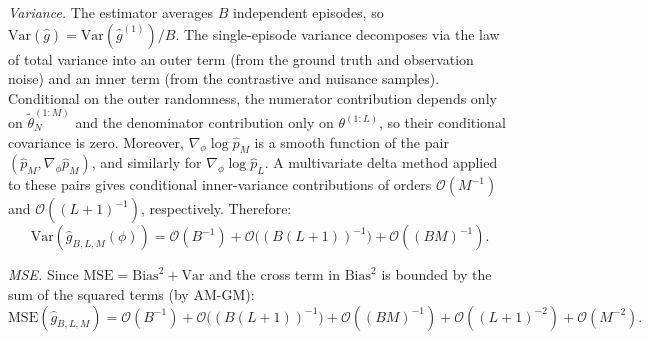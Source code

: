 \emph{Variance.} The estimator averages $B$ independent episodes, so $\mathrm{Var}(\hat g) = \mathrm{Var}(\hat g^{(1)})/B$. The single-episode variance decomposes via the law of total variance into an outer term (from the ground truth and observation noise) and an inner term (from the contrastive and nuisance samples). Conditional on the outer randomness, the numerator contribution depends only on $\tilde{\theta}_N^{(1:M)}$ and the denominator contribution only on $\theta^{(1:L)}$, so their conditional covariance is zero. Moreover, $\nabla_\phi \log \widehat p_M$ is a smooth function of the pair $(\widehat p_M, \nabla_\phi \widehat p_M)$, and similarly for $\nabla_\phi \log \widehat p_L$. A multivariate delta method applied to these pairs gives conditional inner-variance contributions of orders $\mathcal{O}(M^{-1})$ and $\mathcal{O}((L+1)^{-1})$, respectively. Therefore:
\begin{equation}
\mathrm{Var}(\hat g_{B,L,M}(\phi)) = \mathcal{O}(B^{-1}) + \mathcal{O}\big((B(L+1))^{-1}\big) + \mathcal{O}((BM)^{-1}).
\end{equation}

\emph{MSE.} Since $\mathrm{MSE} = \mathrm{Bias}^2 + \mathrm{Var}$ and the cross term in $\mathrm{Bias}^2$ is bounded by the sum of the squared terms (by AM-GM):
\begin{equation}
\label{eq:grad_mse_scaling}
\mathrm{MSE}(\hat g_{B,L,M})
= \mathcal{O}(B^{-1})
+ \mathcal{O}\big((B(L+1))^{-1}\big)
+ \mathcal{O}((BM)^{-1})
+ \mathcal{O}((L+1)^{-2})
+ \mathcal{O}(M^{-2}).
\end{equation}

